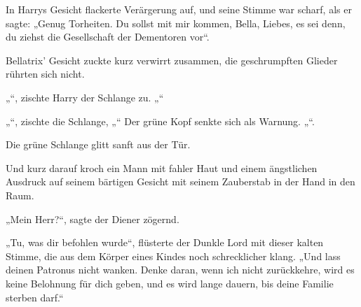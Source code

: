 In Harrys Gesicht flackerte Verärgerung auf, und seine Stimme war scharf, als er sagte: „Genug Torheiten. Du sollst mit mir kommen, Bella, Liebes, es sei denn, du ziehst die Gesellschaft der Dementoren vor“.

Bellatrix’ Gesicht zuckte kurz verwirrt zusammen, die geschrumpften Glieder rührten sich nicht.

„“, zischte Harry der Schlange zu. „“

„“, zischte die Schlange, „“ Der grüne Kopf senkte sich als Warnung. „“.

Die grüne Schlange glitt sanft aus der Tür.

Und kurz darauf kroch ein Mann mit fahler Haut und einem ängstlichen Ausdruck auf seinem bärtigen Gesicht mit seinem Zauberstab in der Hand in den Raum.

„Mein Herr?“, sagte der Diener zögernd.

„Tu, was dir befohlen wurde“, flüsterte der Dunkle Lord mit dieser kalten Stimme, die aus dem Körper eines Kindes noch schrecklicher klang. „Und lass deinen Patronus nicht wanken. Denke daran, wenn ich nicht zurückkehre, wird es keine Belohnung für dich geben, und es wird lange dauern, bis deine Familie sterben darf.“

